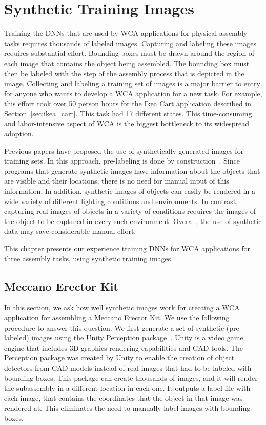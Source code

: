 \chapter{Synthetic Training Images}\label{chap:synthetic}

Training the DNNs that are used by WCA applications for physical assembly tasks
requires thousands of labeled images.
Capturing and labeling these images requires substantial effort.
Bounding boxes must be drawn around the region of each image that
contains the object being assembled.  The bounding box must then be
labeled with the step of the assembly process that is depicted in the
image.  Collecting and labeling a training set of images is a major
barrier to entry for anyone who wants to develop a WCA application for
a new task.
For example, this effort took over 50 person hours for the Ikea Cart application
described in Section~\ref{sec:ikea_cart}.
This task had 17 different states.
This time-consuming and labor-intensive
aspect of WCA is the biggest bottleneck to its widespread adoption.

Previous papers have proposed the use of synthetically generated
images for training sets.  In this approach, pre-labeling is done by
construction~\cite{synthetic_data, DBLP:journals/corr/abs-1809-10790,
  photo2, real_background1, real_background2, real_background3,
  dwibedi}.  Since programs that generate synthetic images have
information about the objects that are visible and their locations,
there is no need for manual input of this information.  In addition,
synthetic images of objects can easily be rendered in a wide variety
of different lighting conditions and environments.  In contrast,
capturing real images of objects in a variety of conditions requires
the images of the object to be captured in every such environment.
Overall, the use of synthetic data may save considerable manual
effort.

This chapter presents our experience training DNNs for WCA applications for
three assembly tasks, using synthetic training images.

\section{Meccano Erector Kit}

In this section, we ask how well synthetic images work for creating a WCA
application for assembling a Meccano Erector Kit.
We use the following procedure to answer this
question.  We first generate a set of synthetic (pre-labeled) images
using the Unity Perception package~\cite{unity}.
Unity is a video game engine that includes 3D graphics rendering capabilities
and CAD tools.
The Perception package was created by Unity to enable the creation of object
detectors from CAD models instead of real images that had to be labeled with
bounding boxes.
This package can create thousands of images, and it will render the subassembly
in a different location in each one.
It outputs a label file with each image, that contains the coordinates that the
object in that image was rendered at.
This eliminates the need to manually label images with bounding boxes.

